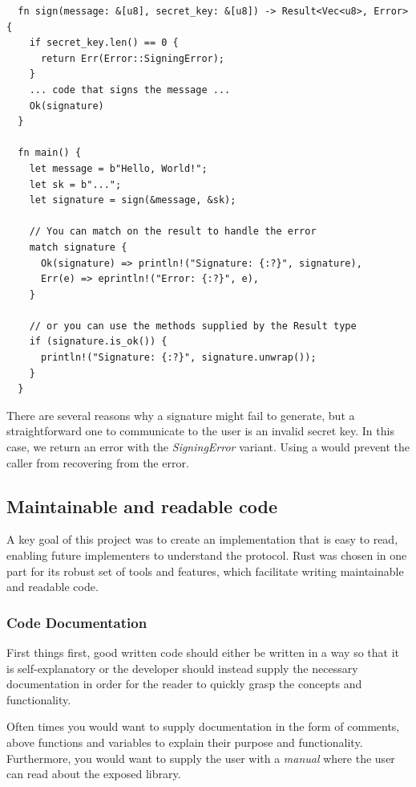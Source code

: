 \documentclass[11pt]{report}
\theoremstyle{definition}
\theoremstyle{plain}
\begin{document}
\begin{verbatim}
  fn sign(message: &[u8], secret_key: &[u8]) -> Result<Vec<u8>, Error> {
    if secret_key.len() == 0 {
      return Err(Error::SigningError);
    }
    ... code that signs the message ...
    Ok(signature)
  }

  fn main() {
    let message = b"Hello, World!";
    let sk = b"...";
    let signature = sign(&message, &sk);

    // You can match on the result to handle the error
    match signature {
      Ok(signature) => println!("Signature: {:?}", signature),
      Err(e) => eprintln!("Error: {:?}", e),
    }

    // or you can use the methods supplied by the Result type
    if (signature.is_ok()) {
      println!("Signature: {:?}", signature.unwrap());
    } 
  }
\end{verbatim}
There are several reasons why a signature might fail to generate, but a straightforward one to communicate to the user is an invalid secret key. In this case, we return an error with the \textit{SigningError} variant. Using a  would prevent the caller from recovering from the error.

\subsection{Maintainable and readable code}

A key goal of this project was to create an implementation that is easy to read, enabling future implementers to understand the protocol. Rust was chosen in one part for its robust set of tools and features, which facilitate writing maintainable and readable code.

\subsubsection{Code Documentation}\label{sub:code-documentation}
First things first, good written code should either be written in a way so that it is self-explanatory or the developer should instead supply the necessary documentation in order for the reader to quickly grasp the concepts and functionality.

Often times you would want to supply documentation in the form of comments, above functions and variables to explain their purpose and functionality. Furthermore, you would want to supply the user with a \textit{manual} where the user can read about the exposed library.
\end{document}
